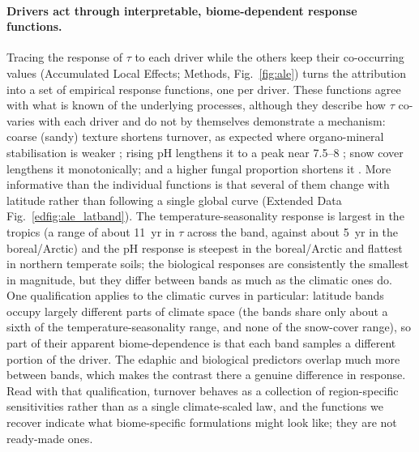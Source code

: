 \documentclass[12pt, a4paper]{article}
\begin{document}
\paragraph{Drivers act through interpretable, biome-dependent response functions.}
Tracing the response of $\tau$ to each driver while the others keep their
co-occurring values (Accumulated Local Effects; Methods, Fig.~\ref{fig:ale})
turns the attribution into a set of empirical response functions, one per driver.
These functions agree with what is known of the underlying processes, although they
describe how $\tau$ co-varies with each driver and do not by themselves demonstrate
a mechanism: coarse (sandy) texture shortens turnover, as
expected where organo-mineral stabilisation is weaker \citep{Hassink1997,Kleber2007,Rasmussen2018}; rising pH lengthens it to a peak near 7.5--8 \citep{Rousk2010,Malik2018}; snow cover lengthens it monotonically; and a higher fungal
proportion shortens it \citep{StricklandRousk2010,Frey2019}. More informative than
the individual functions is that several of them change with latitude rather than
following a single global curve (Extended Data Fig.~\ref{edfig:ale_latband}). The
temperature-seasonality response is largest in the tropics (a range of about
11~yr in $\tau$ across the band, against about 5~yr in the boreal/Arctic) and the pH
response is steepest in the boreal/Arctic and flattest in northern temperate soils;
the biological responses are consistently the smallest in magnitude, but they differ
between bands as much as the climatic ones do. One qualification applies to the
climatic curves in particular: latitude bands occupy largely different parts of
climate space (the bands share only about a sixth of the temperature-seasonality
range, and none of the snow-cover range), so part of their apparent
biome-dependence is that each band samples a different portion of the driver. The
edaphic and biological predictors overlap much more between bands, which makes the
contrast there a genuine difference in response. Read with that qualification,
turnover behaves as a
collection of region-specific sensitivities rather than as a single climate-scaled
law, and the functions we recover indicate what biome-specific formulations might
look like; they are not ready-made ones.
\end{document}
